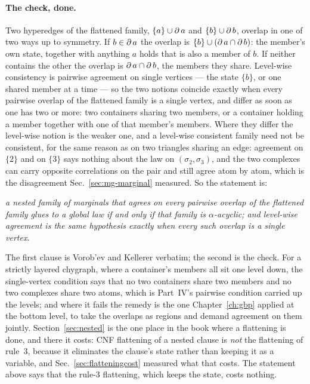\paragraph{The check, done.} Two hyperedges of the flattened family,
$\{a\}\cup\operatorname{\partial} a$ and $\{b\}\cup\operatorname{\partial} b$, overlap in one of two ways up to
symmetry. If $b\in\operatorname{\partial} a$ the overlap is $\{b\}\cup(\operatorname{\partial} a\cap\operatorname{\partial} b)$: the member's
own state, together with anything $a$ holds that is also a member of $b$.
If neither contains the other the overlap is $\operatorname{\partial} a\cap\operatorname{\partial} b$, the
members they share. Level-wise consistency is pairwise agreement on
single vertices --- the state $\{b\}$, or one shared member at a time ---
so the two notions coincide exactly when every pairwise overlap of the
flattened family is a single vertex, and differ as soon as one has two or
more: two containers sharing two members, or a container holding a
member together with one of that member's members. Where they differ the
level-wise notion is the weaker one, and a level-wise consistent family
need not be consistent, for the same reason as on two triangles sharing
an edge: agreement on $\{2\}$ and on $\{3\}$ says nothing about the law on
$(\sigma_{2},\sigma_{3})$, and the two complexes can carry opposite
correlations on the pair and still agree atom by atom, which is the
disagreement Sec.~\ref{sec:mg-marginal} measured. So the statement is:

\begin{center}
\emph{a nested family of marginals that agrees on every pairwise overlap
of the flattened family glues to a global law if and only if that family
is $\alpha$-acyclic; and level-wise agreement is the same hypothesis
exactly when every such overlap is a single vertex.}
\end{center}

The first clause is Vorob'ev and Kellerer verbatim; the second is the
check. For a strictly layered chygraph, where a container's members all
sit one level down, the single-vertex condition says that no two
containers share two members and no two complexes share two atoms, which
is Part~IV's pairwise condition carried up the levels; and where it fails
the remedy is the one Chapter~\ref{ch:gbp} applied at the bottom level,
to take the overlaps as regions and demand agreement on them jointly.
Section~\ref{sec:nested} is the one place in the book where a flattening
is done, and there it costs: CNF flattening of a nested clause is
\emph{not} the flattening of rule~3, because it eliminates the clause's
state rather than keeping it as a variable, and
Sec.~\ref{sec:flatteningcost} measured what that costs. The statement
above says that the rule-3 flattening, which keeps the state, costs
nothing.

